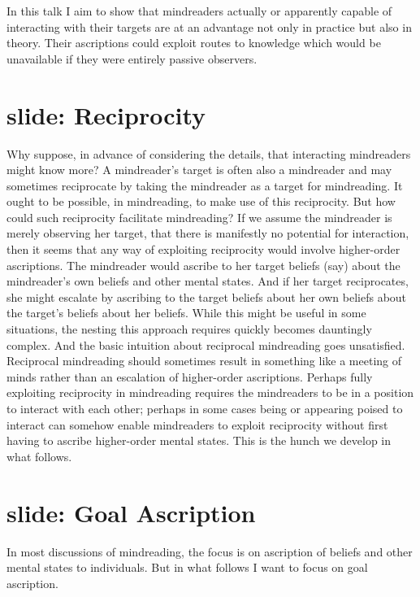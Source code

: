 \documentclass[12pt,\papersize]{extarticle}
\begin{document}
In this talk I aim to show that mindreaders actually or apparently capable of interacting with their targets are at an advantage not only in practice but also in theory.
Their ascriptions could exploit routes to knowledge which would be unavailable if they were entirely passive observers.


\section{slide: Reciprocity}
Why suppose, in advance of considering the details, that interacting mindreaders might know more?
A mindreader's target is often also a mindreader and may sometimes reciprocate by taking the mindreader as a target for mindreading.
It ought to be possible, in mindreading, to make use of this reciprocity.
But how could such reciprocity facilitate mindreading?
If we assume the mindreader is merely observing her target,
that there is manifestly no potential for interaction,
then it seems that any way of exploiting reciprocity would involve higher-order ascriptions. 
The mindreader would ascribe to her target beliefs (say) about the mindreader's own beliefs and other mental states.
And if her target reciprocates, she might escalate by ascribing to the target beliefs about her own beliefs about the target's beliefs about her beliefs.
While this might be useful in some situations, 
the nesting this approach requires quickly becomes dauntingly complex.
And the basic intuition about reciprocal mindreading goes unsatisfied.
Reciprocal mindreading should sometimes result in 
something like a meeting of minds
rather than
an escalation of higher-order ascriptions.
Perhaps fully exploiting reciprocity in mindreading
requires the mindreaders to be in a position to interact with each other;
perhaps in some cases 
being or appearing poised to interact
can somehow enable mindreaders to exploit reciprocity without first having to ascribe higher-order mental states.
This is the hunch we develop in what follows.


\section{slide: Goal Ascription}

In most discussions of mindreading, the focus is on  ascription of beliefs and other mental states to individuals.
But in what follows I want to focus on goal ascription.
\end{document}

